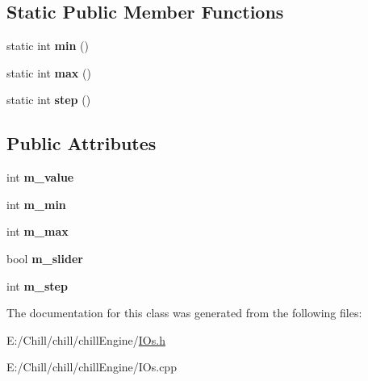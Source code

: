 \subsection*{Static Public Member Functions}
\begin{DoxyCompactItemize}
\item 
\mbox{\label{class_chill_1_1_int_input_a61f8051dcbc2bf06e5a6e9ea86580fa1}} 
static int {\bfseries min} ()
\item 
\mbox{\label{class_chill_1_1_int_input_a8a26e5b95b8446fcbe4027d0f81eb900}} 
static int {\bfseries max} ()
\item 
\mbox{\label{class_chill_1_1_int_input_ad34cb8c956737458505350fee8fb9929}} 
static int {\bfseries step} ()
\end{DoxyCompactItemize}
\subsection*{Public Attributes}
\begin{DoxyCompactItemize}
\item 
\mbox{\label{class_chill_1_1_int_input_ac478c9f2f7c637f74e0cb285ffd9a48a}} 
int {\bfseries m\+\_\+value}
\item 
\mbox{\label{class_chill_1_1_int_input_aad053b1d19511506c50d5b23b48b0621}} 
int {\bfseries m\+\_\+min}
\item 
\mbox{\label{class_chill_1_1_int_input_aa3e4ca0362c622ce7fab831404137670}} 
int {\bfseries m\+\_\+max}
\item 
\mbox{\label{class_chill_1_1_int_input_a2229ad2116d497f8b1bf110e1598774e}} 
bool {\bfseries m\+\_\+slider}
\item 
\mbox{\label{class_chill_1_1_int_input_aa12824fbe3a4083906ccde9b7c097944}} 
int {\bfseries m\+\_\+step}
\end{DoxyCompactItemize}


The documentation for this class was generated from the following files\+:\begin{DoxyCompactItemize}
\item 
E\+:/\+Chill/chill/chill\+Engine/\mbox{\hyperlink{_i_os_8h}{I\+Os.\+h}}\item 
E\+:/\+Chill/chill/chill\+Engine/I\+Os.\+cpp\end{DoxyCompactItemize}
